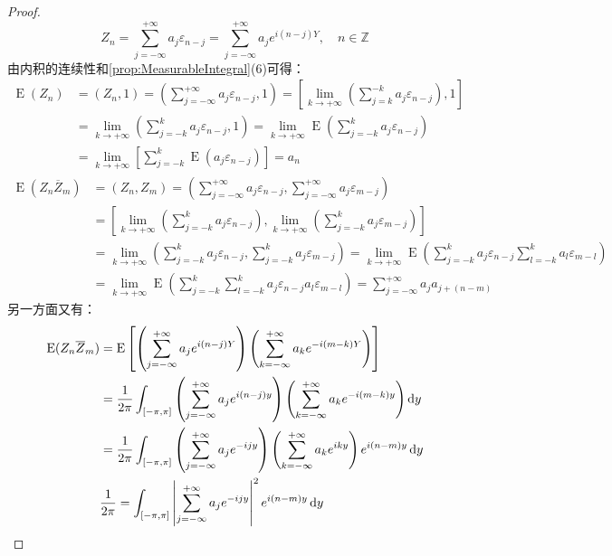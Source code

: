 \begin{proof}
	\begin{equation*}
		Z_n=\sum_{j=-\infty}^{+\infty}a_j\varepsilon_{n-j}=\sum_{j=-\infty}^{+\infty}a_je^{i(n-j)Y},\quad n\in\mathbb{Z}^{}
	\end{equation*}
	由内积的连续性和\cref{prop:MeasurableIntegral}(6)可得：
	\begin{align*}
		\operatorname{E}(Z_n)&=(Z_n,1)=\left(\sum_{j=-\infty}^{+\infty}a_j\varepsilon_{n-j},1\right)=\left[\lim_{k\to+\infty}\left(\sum_{j=k}^{-k}a_j\varepsilon_{n-j}\right),1\right] \\
		&=\lim_{k\to+\infty}\left(\sum_{j=-k}^{k}a_j\varepsilon_{n-j},1\right)=\lim_{k\to+\infty}\operatorname{E}\left(\sum_{j=-k}^{k}a_j\varepsilon_{n-j}\right) \\
		&=\lim_{k\to+\infty}\left[\sum_{j=-k}^{k}\operatorname{E}(a_j\varepsilon_{n-j})\right]=a_n
	\end{align*}
	\begin{align*}
		\operatorname{E}(Z_n\overline{Z}_m)&=(Z_n,Z_m)=\left(\sum_{j=-\infty}^{+\infty}a_j\varepsilon_{n-j},\sum_{j=-\infty}^{+\infty}a_j\varepsilon_{m-j}\right) \\
		&=\left[\lim_{k\to+\infty}\left(\sum_{j=-k}^{k}a_j\varepsilon_{n-j}\right),\lim_{k\to+\infty}\left(\sum_{j=-k}^{k}a_j\varepsilon_{m-j}\right)\right] \\
		&=\lim_{k\to+\infty}\left(\sum_{j=-k}^{k}a_j\varepsilon_{n-j},\sum_{j=-k}^{k}a_j\varepsilon_{m-j}\right)=\lim_{k\to+\infty}\operatorname{E}\left(\sum_{j=-k}^{k}a_j\varepsilon_{n-j}\sum_{l=-k}^{k}a_l\varepsilon_{m-l}\right) \\
		&=\lim_{k\to+\infty}\operatorname{E}\left(\sum_{j=-k}^{k}\sum_{l=-k}^{k}a_j\varepsilon_{n-j}a_l\varepsilon_{m-l}\right)=\sum_{j=-\infty}^{+\infty}a_ja_{j+(n-m)} 
	\end{align*}
	另一方面又有：
	\begin{align*}
		\operatorname{E}(Z_n\overline{Z}_m)&=\operatorname{E}\left[\left(\sum_{j=-\infty}^{+\infty}a_je^{i(n-j)Y}\right)\left(\sum_{k=-\infty}^{+\infty}a_ke^{-i(m-k)Y}\right)\right] \\
		&=\frac{1}{2\pi}\int_{[-\pi,\pi]}\left(\sum_{j=-\infty}^{+\infty}a_je^{i(n-j)y}\right)\left(\sum_{k=-\infty}^{+\infty}a_ke^{-i(m-k)y}\right)\dif y \\
		&=\frac{1}{2\pi}\int_{[-\pi,\pi]}\left(\sum_{j=-\infty}^{+\infty}a_je^{-ijy}\right)\left(\sum_{k=-\infty}^{+\infty}a_ke^{iky}\right)e^{i(n-m)y}\dif y \\
		&\frac{1}{2\pi}=\int_{[-\pi,\pi]}\left|\sum_{j=-\infty}^{+\infty}a_je^{-ijy}\right|^2e^{i(n-m)y}\dif y

\end{align*}
\end{proof}
